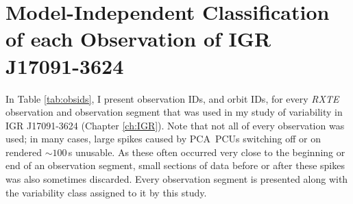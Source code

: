 \chapter{Model-Independent Classification of each Observation of IGR J17091-3624}
\label{app:Obsids}

\par In Table \ref{tab:obsids}, I present observation IDs, and orbit IDs, for every \indexrxte\textit{RXTE} observation and observation segment that was used in my study of variability in IGR J17091-3624 (Chapter \ref{ch:IGR}).  Note that not all of every observation was used; in many cases, large spikes caused by PCA\indexpca\ PCUs switching off or on rendered $\sim100$\,s unusable.  As these often occurred very close to the beginning or end of an observation segment, small sections of data before or after these spikes was also sometimes discarded.  Every observation segment is presented along with the variability class assigned to it by this study.

